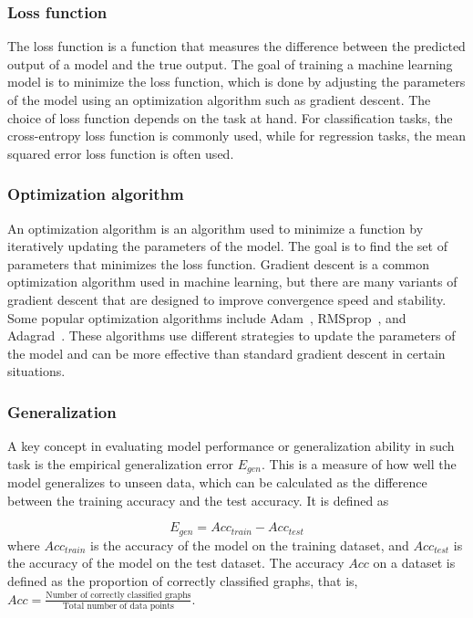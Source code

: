 \documentclass{article}
\begin{document}
\subsubsection{Loss function}
The loss function is a function that measures the difference between the predicted output of a model and the true output. The goal of training a machine learning model is to minimize the loss function, which is done by adjusting the parameters of the model using an optimization algorithm such as gradient descent. The choice of loss function depends on the task at hand. For classification tasks, the cross-entropy loss function is commonly used, while for regression tasks, the mean squared error loss function is often used.

\subsubsection{Optimization algorithm}
An optimization algorithm is an algorithm used to minimize a function by iteratively updating the parameters of the model. The goal is to find the set of parameters that minimizes the loss function. Gradient descent is a common optimization algorithm used in machine learning, but there are many variants of gradient descent that are designed to improve convergence speed and stability. Some popular optimization algorithms include Adam~\cite{kingma2014adam}, RMSprop~\cite{graves2013generating}, and Adagrad~\cite{duchi2011adaptive}. These algorithms use different strategies to update the parameters of the model and can be more effective than standard gradient descent in certain situations. 

\subsubsection{Generalization}
A key concept in evaluating model performance or generalization ability in such task is the empirical generalization error $E_{gen}$. This is a measure of how well the model generalizes to unseen data, which can be calculated as the difference between the training accuracy and the test accuracy. It is defined as

$$
    E_{gen} = {Acc_{train}} - {Acc_{test}}
$$
where $Acc_{train}$ is the accuracy of the model on the training dataset, and $Acc_{test}$ is the accuracy of the model on the test dataset. The accuracy $Acc$ on a dataset is defined as the proportion of correctly classified graphs, that is, $Acc = \frac{\text{Number of correctly classified graphs}}{\text{Total number of data points}}$.
\end{document}
